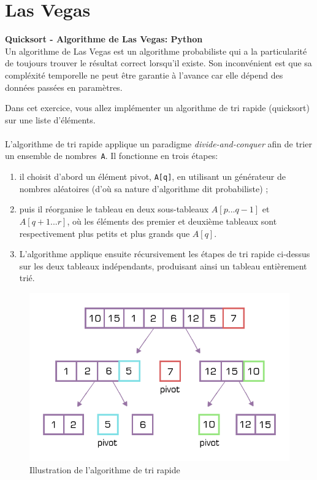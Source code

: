 \section{Las Vegas}
\begin{Exercice}[10 minutes] \textbf{Quicksort - Algorithme de Las Vegas: Python}\\
    Un algorithme de Las Vegas est un algorithme probabiliste qui a la particularité de toujours trouver le résultat correct lorsqu'il existe. Son inconvénient est que sa compléxité temporelle ne peut être garantie à l'avance car elle dépend des données passées en paramètres.

    Dans cet exercice, vous allez implémenter un algorithme de tri rapide (quicksort) sur une liste d'éléments.
\\\\
    L'algorithme de tri rapide applique un paradigme \textit{divide-and-conquer} afin de trier un ensemble de nombres~\lstinline{A}. Il fonctionne en trois étapes: 
    \begin{enumerate}
        \item il choisit d'abord un élément pivot, \lstinline{A[q]}, en utilisant un générateur de nombres aléatoires (d'où sa nature d'algorithme dit probabiliste) ;
        \item puis il réorganise le tableau en deux sous-tableaux $A[p...q-1]$ et $A[q+1...r]$, où les éléments des premier et deuxième tableaux sont respectivement plus petits et plus grands que $A[q]$.
        \item L'algorithme applique ensuite récursivement les étapes de tri rapide ci-dessus sur les deux tableaux indépendants, produisant ainsi un tableau entièrement trié.
    \end{enumerate}
    \begin{figure}[h]
        \centering
        \includegraphics[width=\linewidth]{quicksort.png}
        \caption{Illustration de l'algorithme de tri rapide}
    \end{figure}


\end{Exercice}
